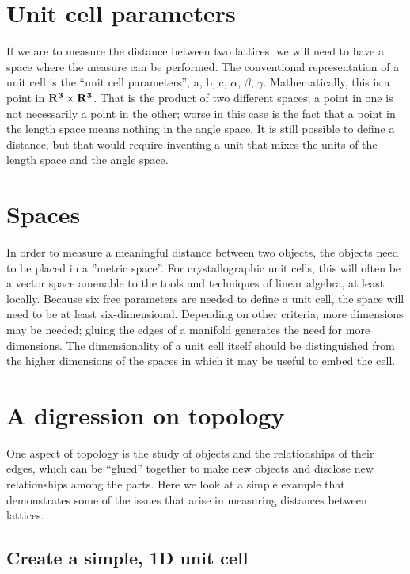 \documentclass[preprint]{iucr}              %
\numberwithin{equation}{section}
\begin{document}
\section{Unit cell parameters}

\label{unitcells}
If we are to measure the distance between two lattices, we will need
to have a space where the measure can be performed. The conventional 
representation of a unit cell is the ``unit cell parameters'', 
a, b, c, $\alpha$, $\beta$, $\gamma$. Mathematically, this is a
point in $\bf{R^3 \times R^3}$. That is the product of two different spaces; a
point in one is not necessarily a point in the other; worse in this
case is the fact that a point in the length space means nothing
in the angle space. It is still possible to define a distance, but 
that would require inventing a unit that mixes the units of the length
space and the angle space.
		
\section{Spaces}
\label{spaces}

In order to measure a meaningful distance between two objects, the objects need to
be placed in a ”metric space”. For crystallographic unit cells, this will often be a
vector space amenable to the tools and techniques of
linear algebra, at least locally. Because six free parameters are needed to define a unit
cell, the space will need to be at least six-dimensional. Depending on
other criteria, more dimensions may be needed; gluing the edges of
a manifold generates the need for more dimensions. The dimensionality of a unit cell itself should be distinguished from the higher dimensions of the spaces in which it may be useful to embed the cell.

\section{A digression on topology}
\label{topology}

One aspect of topology is the study of objects and the relationships
of their edges, which can be ``glued'' together to make new objects
and disclose new relationships among the parts. Here we look at a simple 
example that demonstrates some of the issues that arise
in measuring distances between lattices.

\subsection{Create a simple, 1D unit cell}
	
\end{document}
